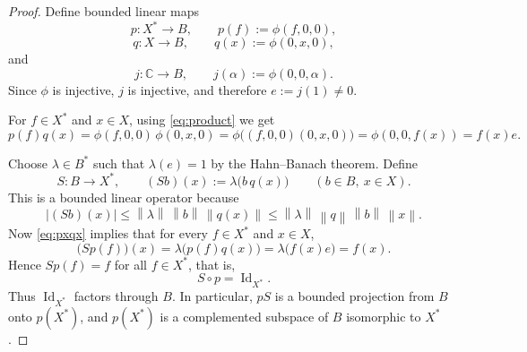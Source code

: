 \documentclass[10pt,a4paper]{amsart}
\newcommand{\C}{\mathbb{C}}
\newcommand{\id}{\operatorname{Id}}
\renewcommand{\le}{\leqslant}
\newcommand{\norm}[1]{\left\lVert #1\right\rVert}
\begin{document}
\begin{proof}
Define bounded linear maps
\[
p:X^*\to B,\qquad p(f):=\phi(f,0,0),
\]
\[
q:X\to B,\qquad q(x):=\phi(0,x,0),
\]
and
\[
j:\C\to B,\qquad j(\alpha):=\phi(0,0,\alpha).
\]
Since $\phi$ is injective, $j$ is injective, and therefore $e:=j(1)\neq 0$.

For $f\in X^*$ and $x\in X$, using \eqref{eq:product} we get
\begin{equation}\label{eq:pxqx}
p(f)q(x)
= \phi(f,0,0)\,\phi(0,x,0)
= \phi\bigl((f,0,0)(0,x,0)\bigr)
= \phi(0,0,f(x))
= f(x)e.
\end{equation}

Choose $\lambda\in B^*$ such that $\lambda(e)=1$ by the Hahn--Banach theorem. Define
\[
S:B\to X^*,
\qquad
(Sb)(x):=\lambda\bigl(b\,q(x)\bigr)
\qquad (b\in B,\ x\in X).
\]
This is a bounded linear operator because
\[
|(Sb)(x)| \le \norm{\lambda}\,\norm{b}\,\norm{q(x)}
\le \norm{\lambda}\,\norm{q}\,\norm{b}\,\norm{x}.
\]
Now \eqref{eq:pxqx} implies that for every $f\in X^*$ and $x\in X$,
\[
\bigl(Sp(f)\bigr)(x)
= \lambda\bigl(p(f)q(x)\bigr)
= \lambda\bigl(f(x)e\bigr)
= f(x).
\]
Hence $Sp(f)=f$ for all $f\in X^*$, that is,
\[
S\circ p = \id_{X^*}.
\]
Thus $\id_{X^*}$ factors through $B$. In particular, $pS$ is a bounded projection from $B$ onto $p(X^*)$, and $p(X^*)$ is a complemented subspace of $B$ isomorphic to $X^*$.
\end{proof}
\end{document}
